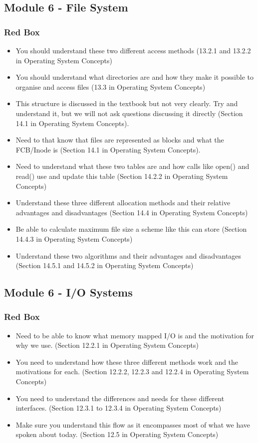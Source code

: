 \documentclass{article}
\begin{document}
\subsection{Module 6 - File System}
\subsubsection{Red Box}
\begin{itemize}
    \item You should understand these two different access methods (13.2.1 and 13.2.2 in Operating System Concepts)
    \item You should understand what directories are and how they make it possible to organise and access files (13.3 in
    Operating System Concepts)
    \item This structure is discussed in the textbook but not very clearly. Try and understand it, but we will not ask
    questions discussing it directly (Section 14.1 in Operating System Concepts).
    \item Need to that know that files are represented as blocks and what the FCB/Inode is (Section 14.1 in Operating
    System Concepts).
    \item Need to understand what these two tables are and how calls like open() and read() use and update this table
    (Section 14.2.2 in Operating System Concepts)
    \item Understand these three different allocation methods and their relative advantages and disadvantages (Section
    14.4 in Operating System Concepts)
    \item Be able to calculate maximum file size a scheme like this can store (Section 14.4.3 in Operating System Concepts)
    \item Understand these two algorithms and their advantages and disadvantages (Section 14.5.1 and 14.5.2 in
    Operating System Concepts)
\end{itemize}


\subsection{Module 6 - I/O Systems}
\subsubsection{Red Box}
\begin{itemize}
    \item Need to be able to know what memory mapped I/O is and the motivation for why we use. (Section 12.2.1 in
    Operating System Concepts)
    \item You need to understand how these three different methods work and the motivations for each. (Section 12.2.2,
    12.2.3 and 12.2.4 in Operating System Concepts)
    \item You need to understand the differences and needs for these different interfaces. (Section 12.3.1 to 12.3.4 in
    Operating System Concepts)
    \item Make sure you understand this flow as it encompasses most of what we have spoken about today. (Section 12.5
    in Operating System Concepts)
\end{itemize}
\end{document}
